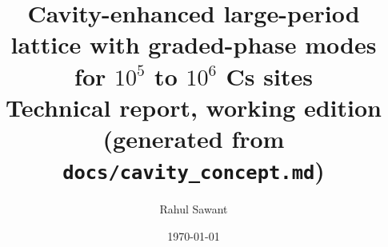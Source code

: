 \documentclass[11pt]{article}
\title{Cavity-enhanced large-period lattice with graded-phase modes for $10^{5}$ to $10^{6}$ Cs sites\\[1ex]\large Technical report, working edition (generated from \texttt{docs/cavity\_concept.md})}
\author{Rahul Sawant\\\placeholder{[CONFIRM?: co-authors and affiliation]}}
\date{\today}
\begin{document}
\maketitle
\tableofcontents
\bigskip

\end{document}

